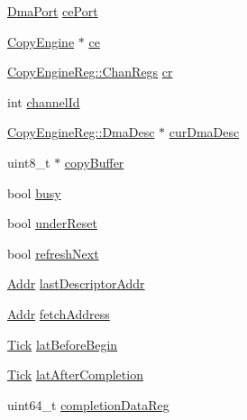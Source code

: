 \begin{DoxyCompactItemize}
\item 
\hyperlink{classDmaPort}{DmaPort} \hyperlink{classCopyEngine_1_1CopyEngineChannel_af65ef939be20997afb5d546cbe2fa253}{cePort}
\item 
\hyperlink{classCopyEngine_1_1CopyEngine}{CopyEngine} $\ast$ \hyperlink{classCopyEngine_1_1CopyEngineChannel_ae925c50266b3cf6452dc9726999e1adc}{ce}
\item 
\hyperlink{structCopyEngineReg_1_1ChanRegs}{CopyEngineReg::ChanRegs} \hyperlink{classCopyEngine_1_1CopyEngineChannel_af1b40caebc370f0d226cb1a52483ddfc}{cr}
\item 
int \hyperlink{classCopyEngine_1_1CopyEngineChannel_a2ee325435cb56082296ff4412aede290}{channelId}
\item 
\hyperlink{structCopyEngineReg_1_1DmaDesc}{CopyEngineReg::DmaDesc} $\ast$ \hyperlink{classCopyEngine_1_1CopyEngineChannel_af8c0eaac54803b25f0dfdbb89600093b}{curDmaDesc}
\item 
uint8\_\-t $\ast$ \hyperlink{classCopyEngine_1_1CopyEngineChannel_afbda594180f4eaeac0026b69add1ca2f}{copyBuffer}
\item 
bool \hyperlink{classCopyEngine_1_1CopyEngineChannel_abbe792bb2cf67584b86443440a194f46}{busy}
\item 
bool \hyperlink{classCopyEngine_1_1CopyEngineChannel_a667d5cc444aa1980eba330fa927415d5}{underReset}
\item 
bool \hyperlink{classCopyEngine_1_1CopyEngineChannel_abfea5a69e8c7ebdb60f68225310d7c6e}{refreshNext}
\item 
\hyperlink{base_2types_8hh_af1bb03d6a4ee096394a6749f0a169232}{Addr} \hyperlink{classCopyEngine_1_1CopyEngineChannel_adc111744ad979f12ef5d0f7afd26c69d}{lastDescriptorAddr}
\item 
\hyperlink{base_2types_8hh_af1bb03d6a4ee096394a6749f0a169232}{Addr} \hyperlink{classCopyEngine_1_1CopyEngineChannel_a5eeb3d755d58eb24d74f92245bf18d2a}{fetchAddress}
\item 
\hyperlink{base_2types_8hh_a5c8ed81b7d238c9083e1037ba6d61643}{Tick} \hyperlink{classCopyEngine_1_1CopyEngineChannel_a34a95aa4b855102c3be97544c155e75a}{latBeforeBegin}
\item 
\hyperlink{base_2types_8hh_a5c8ed81b7d238c9083e1037ba6d61643}{Tick} \hyperlink{classCopyEngine_1_1CopyEngineChannel_aa97db4f2f9c86194366807cd2bd05ae8}{latAfterCompletion}
\item 
uint64\_\-t \hyperlink{classCopyEngine_1_1CopyEngineChannel_a939f73db208ee37ef7d262c44123d65a}{completionDataReg}

\end{DoxyCompactItemize}
